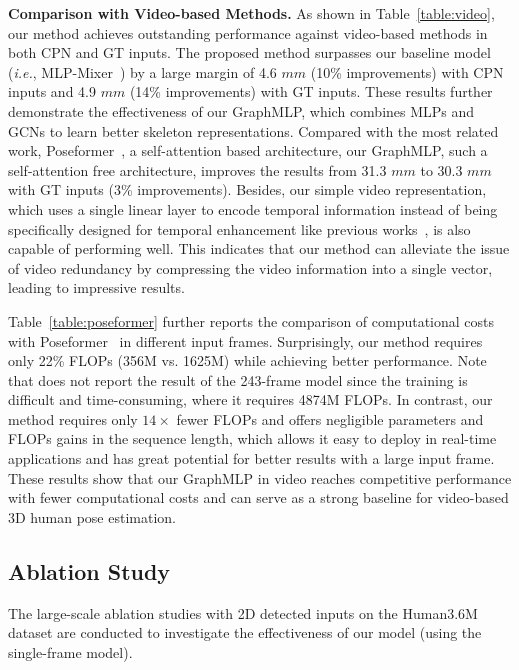 \documentclass[lettersize,journal]{IEEEtran}
\begin{document}
\noindent \textbf{Comparison with Video-based Methods.}
As shown in Table~\ref{table:video}, our method achieves outstanding performance against video-based methods in both CPN and GT inputs. 
The proposed method surpasses our baseline model (\emph{i.e.}, MLP-Mixer~\cite{mlpmixer}) by a large margin of 4.6 $mm$ (10\% improvements) with CPN inputs and 4.9 $mm$ (14\% improvements) with GT inputs.  
These results further demonstrate the effectiveness of our GraphMLP, which combines MLPs and GCNs to learn better skeleton representations. 
Compared with the most related work, Poseformer~\cite{poseformer}, a self-attention based architecture, our GraphMLP, such a self-attention free architecture, improves the results from 31.3 $mm$ to 30.3 $mm$ with GT inputs (3\% improvements). 
Besides, our simple video representation, which uses a single linear layer to encode temporal information instead of being specifically designed for temporal enhancement like previous works~\cite{videopose,chen2021anatomy,poseformer}, is also capable of performing well. 
This indicates that our method can alleviate the issue of video redundancy by compressing the video information into a single vector, leading to impressive results. 

Table~\ref{table:poseformer} further reports the comparison of computational costs with Poseformer~\cite{poseformer} in different input frames. 
Surprisingly, our method requires only 22\% FLOPs (356M vs. 1625M) while achieving better performance. 
Note that \cite{poseformer} does not report the result of the 243-frame model since the training is difficult and time-consuming, where it requires 4874M FLOPs. 
In contrast, our method requires only $14 \times$ fewer FLOPs and offers negligible parameters and FLOPs gains in the sequence length, which allows it easy to deploy in real-time applications and has great potential for better results with a large input frame. 
These results show that our GraphMLP in video reaches competitive performance with fewer computational costs and can serve as a strong baseline for video-based 3D human pose estimation. 

\subsection{Ablation Study}
The large-scale ablation studies with 2D detected inputs on the Human3.6M dataset are conducted to investigate the effectiveness of our model (using the single-frame model). 
\end{document}
